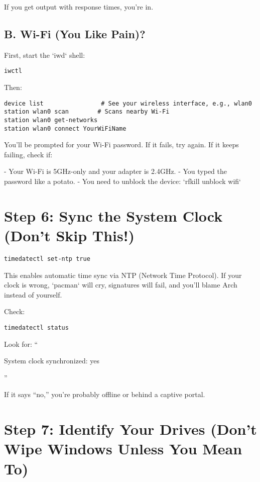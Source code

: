 \documentclass[12pt,openany]{book}
\begin{document}
If you get output with response times, you’re in.

\subsection*{B. Wi-Fi (You Like Pain)?}

First, start the `iwd` shell:
\begin{lstlisting}
iwctl
\end{lstlisting}

Then:

\begin{lstlisting}
device list                # See your wireless interface, e.g., wlan0
station wlan0 scan        # Scans nearby Wi-Fi
station wlan0 get-networks
station wlan0 connect YourWiFiName
\end{lstlisting}

You’ll be prompted for your Wi-Fi password.  
If it fails, try again. If it keeps failing, check if:

- Your Wi-Fi is 5GHz-only and your adapter is 2.4GHz.
- You typed the password like a potato.
- You need to unblock the device: `rfkill unblock wifi`

\section*{Step 6: Sync the System Clock (Don’t Skip This!)}

\begin{lstlisting}
timedatectl set-ntp true
\end{lstlisting}

This enables automatic time sync via NTP (Network Time Protocol). If your clock is wrong, `pacman` will cry, signatures will fail, and you’ll blame Arch instead of yourself.

Check:
\begin{lstlisting}
timedatectl status
\end{lstlisting}

Look for:
``

System clock synchronized: yes

''

If it says “no,” you’re probably offline or behind a captive portal.

\section*{Step 7: Identify Your Drives (Don't Wipe Windows Unless You Mean To)}
\end{document}
